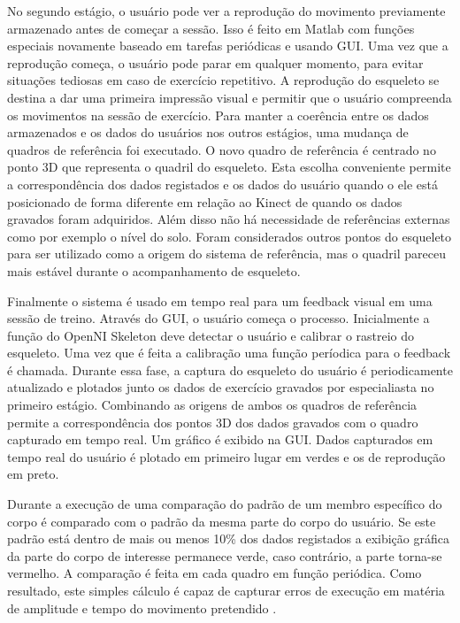No segundo estágio, o usuário pode ver a reprodução do movimento previamente armazenado
antes de começar a sessão. Isso é feito em Matlab com funções especiais novamente
baseado em tarefas periódicas e usando GUI. Uma vez que a reprodução começa, o usuário
pode parar em qualquer momento, para evitar situações tediosas em caso de exercício
repetitivo. A reprodução do esqueleto se destina a dar uma primeira impressão visual
e permitir que o usuário compreenda os movimentos na sessão de exercício. Para manter
a coerência entre os dados armazenados e os dados do usuários nos outros estágios,
uma mudança de quadros de referência foi executado. O novo quadro de referência
é centrado no ponto 3D que representa o quadril do esqueleto.
Esta escolha conveniente permite a correspondência dos dados registados e os dados
 do usuário quando o ele está posicionado de forma diferente em relação ao Kinect
 de quando os dados gravados foram adquiridos. Além disso não há necessidade
de referências externas como por exemplo o nível do solo. Foram considerados outros
 pontos do esqueleto para ser utilizado como a origem do sistema de referência,
mas o quadril pareceu mais estável durante o acompanhamento de esqueleto.

Finalmente o sistema é usado em tempo real para um feedback visual em uma sessão
de treino. Através do GUI, o usuário começa o processo. Inicialmente a função do
 OpenNI Skeleton deve detectar o usuário e calibrar o rastreio do esqueleto. Uma
vez que é feita a calibração uma função períodica para o feedback é chamada. Durante
essa fase, a captura do esqueleto do usuário é periodicamente atualizado e plotados
junto os dados de exercício gravados por especialiasta no primeiro estágio. Combinando
 as origens de ambos os quadros de referência permite a correspondência dos pontos 3D
 dos dados gravados com o quadro capturado em tempo real. Um gráfico é exibido na GUI.
 Dados capturados em tempo real do usuário é plotado em primeiro lugar em verdes
e os de reprodução em preto.

Durante a execução de uma comparação do padrão de um membro específico do corpo
 é comparado com o padrão da mesma parte do corpo do usuário. Se este padrão está
 dentro de mais ou menos 10\% dos dados registados a exibição gráfica da parte
do corpo de interesse permanece verde, caso contrário, a parte torna-se vermelho.
A comparação é feita em cada quadro em função periódica. Como resultado, este simples
cálculo é capaz de capturar erros de execução em matéria de amplitude e tempo do
movimento pretendido \cite{roberto}.

